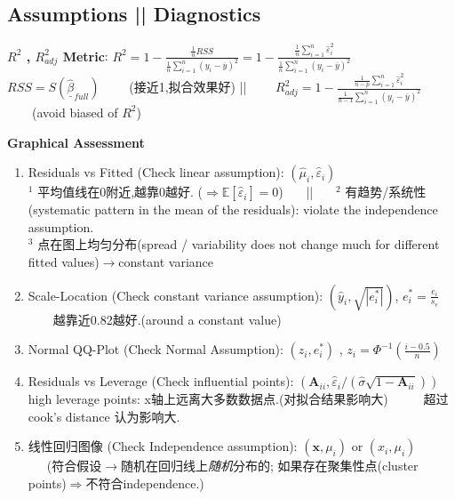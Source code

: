 \documentclass[9pt]{article}
\begin{document}
\subsection{Assumptions || Diagnostics}

\vspace{-3.5pt}
\textbf{$R^2$ , $R^2_{adj}$ Metric}: $R^2=1-\frac{\frac{1}{n}RSS}{\frac{1}{n}\sum^n_{i=1}(y_i-\overline{y})^2}=1-\frac{\frac{1}{n}\sum^n_{i=1}\widehat{\varepsilon}_i^2}{\frac{1}{n}\sum^n_{i=1}(y_i-\overline{y})^2}$ \ \ {\scriptsize $RSS=S(\underline{\widehat{\beta}}_{full})$} \ \ \ \ {\tiny (接近1,拟合效果好)} || \ \ \ \ $R^2_{adj}=1-\frac{\frac{1}{n-p}\sum^n_{i=1}\widehat{\varepsilon}^2_i}{\frac{1}{n-1}\sum^n_{i=1}(y_i-\overline{y})^2}$ \ \ \ \ {\tiny (avoid biased of $R^2$)}
\vspace{-3.5pt}

\textbf{Graphical Assessment}
{\footnotesize
\begin{enumerate}[itemsep=-3pt, topsep=0pt]
    \item Residuals vs Fitted (Check linear assumption): $(\widehat{\mu}_i,\widehat{\varepsilon}_i)$ \\
    {\tiny $^1$ 平均值线在0附近,越靠0越好. ($\Rightarrow\mathbb{E}[\widehat{\varepsilon}_i]=0$) \ \ \ || \ \ \ $^2$ 有趋势/系统性(systematic pattern in the mean of the residuals): violate the independence assumption.} \\
    {\tiny $^3$ 点在图上均匀分布(spread / variability does not change much for different fitted values)$\to$constant variance}
    \item Scale-Location (Check constant variance assumption): $(\hat{y}_i,\sqrt{|e^*_i|})$, $e^*_i=\frac{e_i}{s_e}$ \ \ \ \  越靠近0.82越好.(around a constant value)
    \item Normal QQ-Plot (Check Normal Assumption): $(z_i,e^*_i)$ , $z_i=\Phi^{-1}(\frac{i-0.5}{n})$
    \item Residuals vs Leverage (Check influential points): $(\mathbf{A}_{ii},\widehat{\varepsilon}_i/(\widehat{\sigma}\sqrt{1-\mathbf{A}_{ii}}))$ {\scriptsize high leverage points: x轴上远离大多数数据点.{\tiny (对拟合结果影响大)} \ \ \ \ \ 超过cook's distance 认为影响大.}
    \item {\scriptsize 线性回归图像 (Check Independence assumption): $(\mathbf{x},\mu_i)$ or $(x_i,\mu_i)$ \ \ \ (符合假设$\rightarrow$随机在回归线上\textit{随机}分布的; 如果存在聚集性点(cluster points)$\Rightarrow$不符合independence.)}
\end{enumerate}
}
\end{document}
